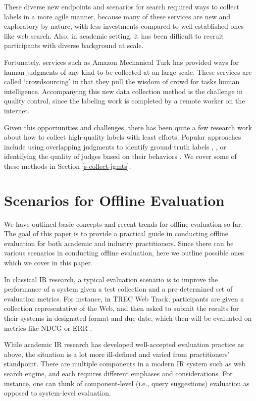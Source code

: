\documentclass[openany]{now} %
\newcommand{\authornote}[3]{\marginpar{\tiny\color{#1}#2: #3}{\color{#1}{$\star$}}}
\newcommand{\emine}[1]{\authornote{green}{Emine}{#1}}
\begin{document}
These diverse new endpoints and scenarios for search required ways to collect labels in a more agile manner, because many of these services are new and exploratory by nature, with less investments compared to well-established ones like web search. Also, in academic setting, it has been difficult to recruit participants with diverse background at scale.

Fortunately, services such as Amazon Mechanical Turk has provided ways for human judgments of any kind to be collected at an large scale. These services are called `crowdsourcing' in that they pull the wisdom of crowd for tasks human intelligence. Accompanying this new data collection method is the challenge in quality control, since the labeling work is completed by a remote worker on the internet.

Given this opportunities and challenges, there has been quite a few research work \cite{Alonso2012} about how to collect high-quality labels with least efforts. Popular approaches include using overlapping judgments to identify ground truth labels \cite{Venanzi:2014}, , or identifying the quality of judges based on their behaviors \cite{Kazai:2016}. We cover some of these methods in Section \ref{s-collect-jgmts}.


\section{Scenarios for Offline Evaluation}

We have outlined basic concepts and recent trends for offline evaluation so far. The goal of this paper is to provide a practical guide in conducting offline evaluation for both academic and industry practitioners. Since there can be various scenarios in conducting offline evaluation, here we outline possible ones which we cover in this paper.

In classical IR research, a typical evaluation scenario is to improve the performance of a system given a test collection and a pre-determined set of evaluation metrics. For instance, in TREC Web Track, participants are given a collection representative of the Web, and then asked to submit the results for their systems in designated format and due date, which then will be evaluated on metrics like NDCG \cite{Jarvelin:2002} or ERR \cite{ChapelleMZG09}.

While academic IR research has developed well-accepted evaluation practice as above, the situation is a lot more ill-defined and varied from practitioners' standpoint. There are multiple components in a modern IR system such as web search engine, and each requires different emphases and considerations. For instance, one can think of component-level (i.e., query suggestions) evaluation as opposed to system-level evaluation. 
\end{document}
